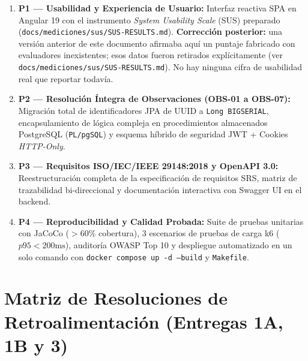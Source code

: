 \documentclass[10pt,a4paper]{article}
\begin{document}
\begin{tcolorbox}[colframe=boxred,colback=boxredbg,arc=1mm,boxrule=1pt,title={\bfseries 1. Criterios de Excelencia del Avance 3 (Puntos Clave del Proyecto)}]
\begin{enumerate}
    \item \textbf{P1 --- Usabilidad y Experiencia de Usuario:} Interfaz reactiva SPA en Angular 19 con el instrumento \textit{System Usability Scale} (SUS) preparado (\texttt{docs/mediciones/sus/SUS-RESULTS.md}). \textbf{Corrección posterior:} una versión anterior de este documento afirmaba aquí un puntaje fabricado con evaluadores inexistentes; esos datos fueron retirados explícitamente (ver \texttt{docs/mediciones/sus/SUS-RESULTS.md}). No hay ninguna cifra de usabilidad real que reportar todavía.
    \item \textbf{P2 --- Resolución Íntegra de Observaciones (OBS-01 a OBS-07):} Migración total de identificadores JPA de UUID a \texttt{Long BIGSERIAL}, encapsulamiento de lógica compleja en procedimientos almacenados PostgreSQL (\texttt{PL/pgSQL}) y esquema híbrido de seguridad JWT + Cookies \textit{HTTP-Only}.
    \item \textbf{P3 --- Requisitos ISO/IEC/IEEE 29148:2018 y OpenAPI 3.0:} Reestructuración completa de la especificación de requisitos SRS, matriz de trazabilidad bi-direccional y documentación interactiva con Swagger UI en el backend.
    \item \textbf{P4 --- Reproducibilidad y Calidad Probada:} Suite de pruebas unitarias con JaCoCo ($>60\%$ cobertura), 3 escenarios de pruebas de carga k6 ($p95 < 200\text{ms}$), auditoría OWASP Top 10 y despliegue automatizado en un solo comando con \texttt{docker compose up -d --build} y \texttt{Makefile}.
\end{enumerate}
\end{tcolorbox}

\vspace{0.4cm}

\section{Matriz de Resoluciones de Retroalimentación (Entregas 1A, 1B y 3)}
\end{document}
